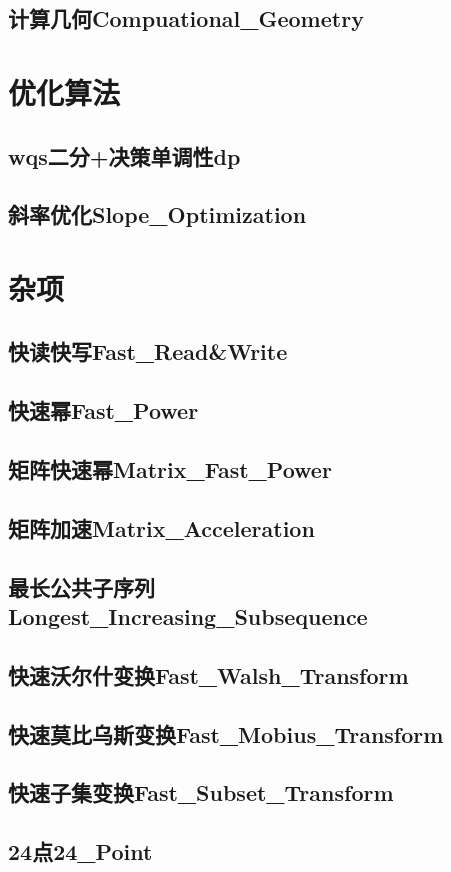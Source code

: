 \documentclass[10pt,a4paper]{article}
\begin{document}
\subsection{计算几何Compuational\_Geometry}


\newpage
\section{优化算法}
\subsection{wqs二分+决策单调性dp}

\subsection{斜率优化Slope\_Optimization}


\newpage
\section{杂项}
\subsection{快读快写Fast\_Read\&Write}

\subsection{快速幂Fast\_Power}

\subsection{矩阵快速幂Matrix\_Fast\_Power}

\subsection{矩阵加速Matrix\_Acceleration}

\subsection{最长公共子序列Longest\_Increasing\_Subsequence}

\subsection{快速沃尔什变换Fast\_Walsh\_Transform}

\subsection{快速莫比乌斯变换Fast\_Mobius\_Transform}

\subsection{快速子集变换Fast\_Subset\_Transform}

\subsection{24点24\_Point}

\end{document}

